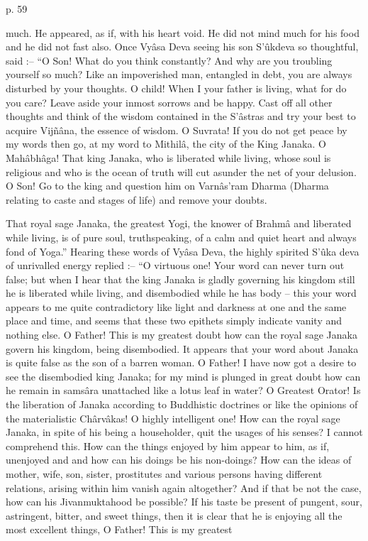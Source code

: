  

p. 59

 

much. He appeared, as if, with his heart void. He did not mind much for his food and he did not fast also. Once Vyâsa Deva seeing his son S'ûkdeva so thoughtful, said :-- “O Son! What do you think constantly? And why are you troubling yourself so much? Like an impoverished man, entangled in debt, you are always disturbed by your thoughts. O child! When I your father is living, what for do you care? Leave aside your inmost sorrows and be happy. Cast off all other thoughts and think of the wisdom contained in the S’âstras and try your best to acquire Vijñâna, the essence of wisdom. O Suvrata! If you do not get peace by my words then go, at my word to Mithilâ, the city of the King Janaka. O Mahâbhâga! That king Janaka, who is liberated while living, whose soul is religious and who is the ocean of truth will cut asunder the net of your delusion. O Son! Go to the king and question him on Varnâs'ram Dharma (Dharma relating to caste and stages of life) and remove your doubts.

 

That royal sage Janaka, the greatest Yogi, the knower of Brahmâ and liberated while living, is of pure soul, truthspeaking, of a calm and quiet heart and always fond of Yoga.” Hearing these words of Vyâsa Deva, the highly spirited S’ûka deva of unrivalled energy replied :-- “O virtuous one! Your word can never turn out false; but when I hear that the king Janaka is gladly governing his kingdom still he is liberated while living, and disembodied while he has body -- this your word appears to me quite contradictory like light and darkness at one and the same place and time, and seems that these two epithets simply indicate vanity and nothing else. O Father! This is my greatest doubt how can the royal sage Janaka govern his kingdom, being disembodied. It appears that your word about Janaka is quite false as the son of a barren woman. O Father! I have now got a desire to see the disembodied king Janaka; for my mind is plunged in great doubt how can he remain in samsâra unattached like a lotus leaf in water? O Greatest Orator! Is the liberation of Janaka according to Buddhistic doctrines or like the opinions of the materialistic Chârvâkas! O highly intelligent one! How can the royal sage Janaka, in spite of his being a householder, quit the usages of his senses? I cannot comprehend this. How can the things enjoyed by him appear to him, as if, unenjoyed and and how can his doings be his non-doings? How can the ideas of mother, wife, son, sister, prostitutes and various persons having different relations, arising within him vanish again altogether? And if that be not the case, how can his Jivanmuktahood be possible? If his taste be present of pungent, sour, astringent, bitter, and sweet things, then it is clear that he is enjoying all the most excellent things, O Father! This is my greatest

